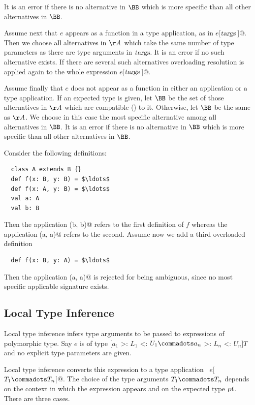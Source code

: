 It is an error if there is no alternative in $\BB$ which is more
specific than all other alternatives in $\BB$.

Assume next that $e$ appears as a function in a type application, as
in \lstinline@$e$[$\mbox{\sl targs}\,$]@. Then we choose all alternatives in
$\AA$ which take the same number of type parameters as there are type
arguments in $\mbox{\sl targs}$. It is an error if no such alternative exists.
If there are several such alternatives overloading resolution is
applied again to the whole expression \lstinline@$e$[$\mbox{\sl targs}\,$]@.  

Assume finally that $e$ does not appear as a function in either
an application or a type application. If an expected type is given,
let $\BB$ be the set of those alternatives in $\AA$ which are
compatible () to it. Otherwise, let $\BB$ be the same as $\AA$.
We choose in this case the most specific alternative among all
alternatives in $\BB$. It is an error if there is no 
alternative in $\BB$ which is more specific than all other
alternatives in $\BB$.

\example Consider the following definitions:

\begin{lstlisting}
  class A extends B {}
  def f(x: B, y: B) = $\ldots$
  def f(x: A, y: B) = $\ldots$
  val a: A 
  val b: B
\end{lstlisting}
Then the application \lstinline@f(b, b)@ refers to the first
definition of $f$ whereas the application \lstinline@f(a, a)@
refers to the second.  Assume now we add a third overloaded definition
\begin{lstlisting}
  def f(x: B, y: A) = $\ldots$
\end{lstlisting}
Then the application \lstinline@f(a, a)@ is rejected for being ambiguous, since
no most specific applicable signature exists.

\subsection{Local Type Inference}
\label{sec:local-type-inf}

Local type inference infers type arguments to be passed to expressions
of polymorphic type. Say $e$ is of type [$a_1$ >: $L_1$ <: $U_1
\commadots a_n$ >: $L_n$ <: $U_n$]$T$ and no explicit type parameters
are given. 

Local type inference converts this expression to a type
application ~\lstinline@$e$[$T_1 \commadots T_n$]@. The choice of the
type arguments $T_1 \commadots T_n$ depends on the context in which
the expression appears and on the expected type $\mbox{\sl pt}$. 
There are three cases.

